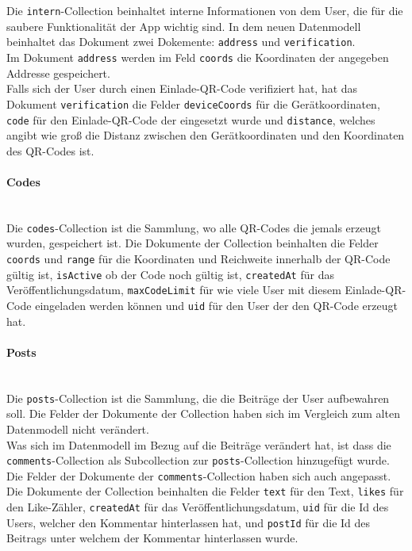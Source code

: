 \\\\
Die \texttt{intern}-Collection beinhaltet interne Informationen von dem User, die für die saubere Funktionalität der App wichtig sind. In dem neuen Datenmodell beinhaltet das Dokument zwei Dokemente: \texttt{address} und \texttt{verification}.
\\
Im Dokument \texttt{address} werden im Feld \texttt{coords} die Koordinaten der angegeben Addresse gespeichert.
\\
Falls sich der User durch einen Einlade-QR-Code verifiziert hat, hat das Dokument \texttt{verification} die Felder \texttt{deviceCoords} für die Gerätkoordinaten, \texttt{code} für den Einlade-QR-Code der eingesetzt wurde und \texttt{distance}, welches angibt wie groß die Distanz zwischen den Gerätkoordinaten und den Koordinaten des QR-Codes ist.

\paragraph{Codes}\mbox{} \\
Die \texttt{codes}-Collection ist die Sammlung, wo alle QR-Codes die jemals erzeugt wurden, gespeichert ist. Die Dokumente der Collection beinhalten die Felder \texttt{coords} und \texttt{range} für die Koordinaten und Reichweite innerhalb der QR-Code gültig ist, \texttt{isActive} ob der Code noch gültig ist, \texttt{createdAt} für das Veröffentlichungsdatum, \texttt{maxCodeLimit} für wie viele User mit diesem Einlade-QR-Code eingeladen werden können und \texttt{uid} für den User der den QR-Code erzeugt hat.

\paragraph{Posts}\mbox{} \\
Die \texttt{posts}-Collection ist die Sammlung, die die Beiträge der User aufbewahren soll. Die Felder der Dokumente der Collection haben sich im Vergleich zum alten Datenmodell nicht verändert.
\\
Was sich im Datenmodell im Bezug auf die Beiträge verändert hat, ist dass die \texttt{comments}-Collection als Subcollection zur \texttt{posts}-Collection hinzugefügt wurde. Die Felder der Dokumente der \texttt{comments}-Collection haben sich auch angepasst. Die Dokumente der Collection beinhalten die Felder \texttt{text} für den Text, \texttt{likes} für den Like-Zähler, \texttt{createdAt} für das Veröffentlichungsdatum, \texttt{uid} für die Id des Users, welcher den Kommentar hinterlassen hat, und \texttt{postId} für die Id des Beitrags unter welchem der Kommentar hinterlassen wurde.

